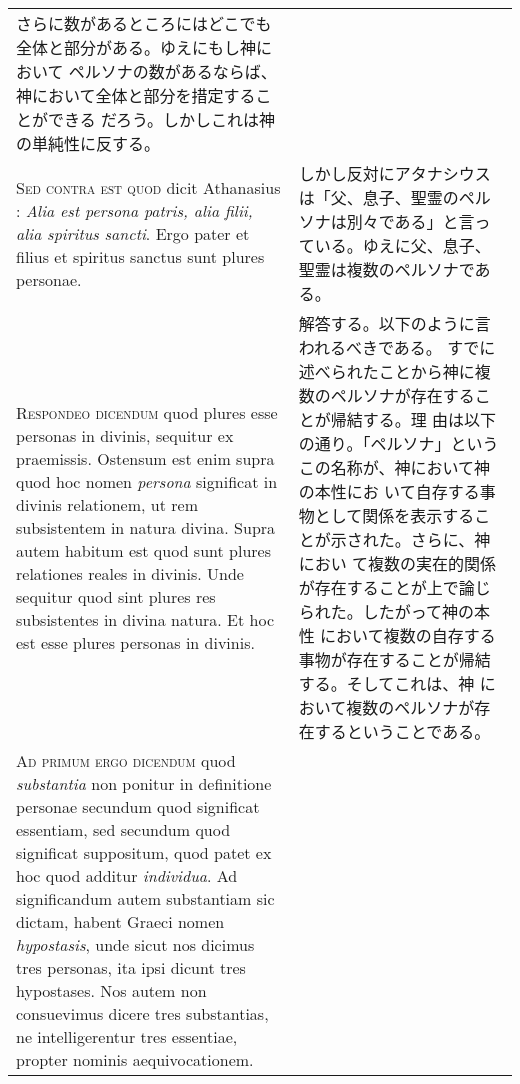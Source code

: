 \documentclass[10pt]{jsarticle} %
\begin{document}
\begin{longtable}{p{21em}p{21em}}
さらに数があるところにはどこでも全体と部分がある。ゆえにもし神において
 ペルソナの数があるならば、神において全体と部分を措定することができる
 だろう。しかしこれは神の単純性に反する。

\\



{\scshape Sed contra est quod} dicit Athanasius : {\itshape Alia est persona patris, alia
filii, alia spiritus sancti}. Ergo pater et filius et spiritus sanctus
sunt plures personae.


&

しかし反対にアタナシウスは「父、息子、聖霊のペルソナは別々である」と言っ
 ている。ゆえに父、息子、聖霊は複数のペルソナである。


\\



{\scshape Respondeo dicendum} quod plures esse personas in divinis, sequitur ex
praemissis. Ostensum est enim supra quod hoc nomen {\itshape persona} significat
in divinis relationem, ut rem subsistentem in natura divina. Supra
autem habitum est quod sunt plures relationes reales in divinis. Unde
sequitur quod sint plures res subsistentes in divina natura. Et hoc
est esse plures personas in divinis.


&

解答する。以下のように言われるべきである。
すでに述べられたことから神に複数のペルソナが存在することが帰結する。理
 由は以下の通り。「ペルソナ」というこの名称が、神において神の本性にお
 いて自存する事物として関係を表示することが示された。さらに、神におい
 て複数の実在的関係が存在することが上で論じられた。したがって神の本性
 において複数の自存する事物が存在することが帰結する。そしてこれは、神
 において複数のペルソナが存在するということである。

\\



{\scshape Ad primum ergo dicendum} quod {\itshape substantia} non ponitur in definitione
personae secundum quod significat essentiam, sed secundum quod
significat suppositum, quod patet ex hoc quod additur {\itshape individua}. Ad
significandum autem substantiam sic dictam, habent Graeci nomen
{\itshape hypostasis}, unde sicut nos dicimus tres personas, ita ipsi dicunt tres
hypostases. Nos autem non consuevimus dicere tres substantias, ne
intelligerentur tres essentiae, propter nominis aequivocationem.


&


\end{longtable}
\end{document}
